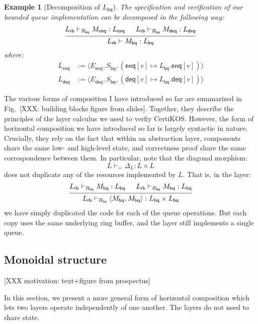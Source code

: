 \documentclass[draft,11pt]{report}
\newtheorem{example}[theorem]{Example}
\theoremstyle{definition}
\newcommand{\kw}[1]{\ensuremath{ \mathsf{#1} }}
\begin{document}
\begin{example}[Decomposition of $L_\kw{bq}$]
The specification and verification of
our bounded queue implementation can be decomposed
in the following way:
\[
  \begin{prooftree}
    \hypo{L_\kw{rb} \vdash_{R_\kw{bq}} M_\kw{enq} : L_\kw{enq}}
    \hypo{L_\kw{rb} \vdash_{R_\kw{bq}} M_\kw{deq} : L_\kw{deq}}
    \infer2{L_\kw{rb} \vdash M_\kw{bq} : L_\kw{bq}}
  \end{prooftree}
\]
where:
\begin{align*}
  L_\kw{enq} &:=
    \langle E_\kw{enq}, S_\kw{bq},
      (\kw{enq}[v] \mapsto L_\kw{bq}.\kw{enq}[v]) \rangle \\
  L_\kw{deq} &:=
    \langle E_\kw{deq}, S_\kw{bq},
      (\kw{deq}[v] \mapsto L_\kw{bq}.\kw{deq}[v]) \rangle
\end{align*}
\end{example}

The various forms of composition I have introduced so far
are summarized in Fig.~[XXX: building blocks figure from slides].
Together,
they describe the principles of the layer calculus we used
to verfiy CertiKOS.
However,
the form of horizontal composition we have introduced so far
is largely syntactic in nature.
Crucially,
they rely on the fact that within an abstraction layer,
components share the same low- and high-level state,
and correctness proof share the same correspondence between them.
In particular,
note that the diagonal morphism:
\[
  L \vdash_{=} \Delta_L : L \times L
\]
does not duplicate any of the resources implemented by $L$.
That is, in the layer:
\[
  \begin{prooftree}
    \hypo{L_\kw{rb} \vdash_{R_\kw{bq}} M_\kw{bq} : L_\kw{bq}}
    \hypo{L_\kw{rb} \vdash_{R_\kw{bq}} M_\kw{bq} : L_\kw{bq}}
    \infer2{L_\kw{rb} \vdash_{R_\kw{bq}}
      \langle M_\kw{bq}, M_\kw{bq} \rangle :
      L_\kw{bq} \times L_\kw{bq}}
  \end{prooftree}
\]
we have simply duplicated the code for each of the queue operations.
But each copy uses the same underlying ring buffer,
and the layer still implements a single queue.


\subsection{Monoidal structure} %


[XXX motivation: text+figure from prospectus]

In this section,
we present a more general form of horizontal composition
which lets two layers operate independently of one another.
The layers do not need to share state.
\end{document}
